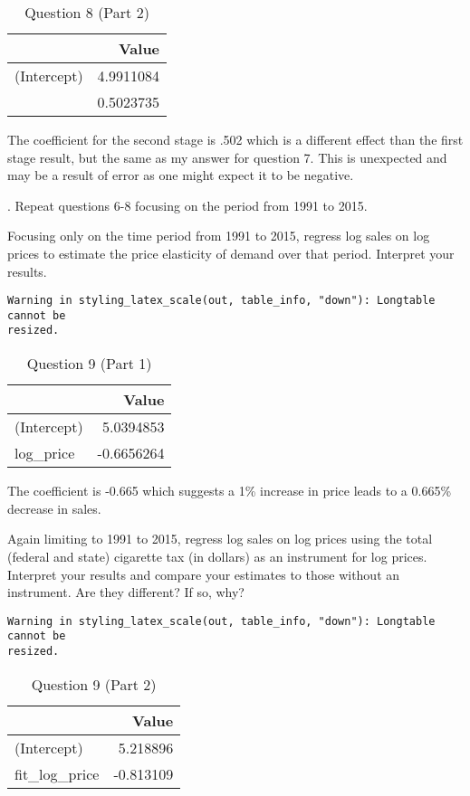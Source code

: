 \documentclass[
  letterpaper,
  DIV=11,
  numbers=noendperiod]{scrartcl}
\begin{document}
\begin{longtable}[t]{lr}
\caption{Question 8 (Part 2)}\tabularnewline

\toprule
 & Value\\
\midrule
(Intercept) & 4.9911084\\
 & 0.5023735\\
\bottomrule
\end{longtable}

The coefficient for the second stage is .502 which is a different effect
than the first stage result, but the same as my answer for question 7.
This is unexpected and may be a result of error as one might expect it
to be negative.

\newpage

. Repeat questions 6-8 focusing on the period from 1991 to
2015.

 Focusing only on the time period from 1991 to 2015,
regress log sales on log prices to estimate the price elasticity of
demand over that period. Interpret your results.

\begin{verbatim}
Warning in styling_latex_scale(out, table_info, "down"): Longtable cannot be
resized.
\end{verbatim}

\begin{longtable}[t]{lr}
\caption{Question 9 (Part 1)}\tabularnewline

\toprule
 & Value\\
\midrule
(Intercept) & 5.0394853\\
log\_price & -0.6656264\\
\bottomrule
\end{longtable}

The coefficient is -0.665 which suggests a 1\% increase in price leads
to a 0.665\% decrease in sales.

\newpage

 Again limiting to 1991 to 2015, regress log sales on log
prices using the total (federal and state) cigarette tax (in dollars) as
an instrument for log prices. Interpret your results and compare your
estimates to those without an instrument. Are they different? If so,
why?

\begin{verbatim}
Warning in styling_latex_scale(out, table_info, "down"): Longtable cannot be
resized.
\end{verbatim}

\begin{longtable}[t]{lr}
\caption{Question 9 (Part 2)}\tabularnewline

\toprule
 & Value\\
\midrule
(Intercept) & 5.218896\\
fit\_log\_price & -0.813109\\
\bottomrule
\end{longtable}
\end{document}
